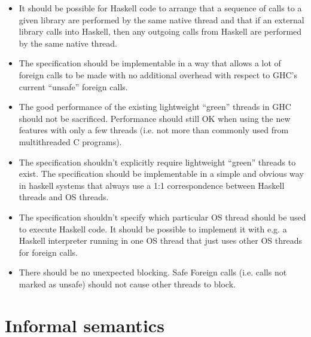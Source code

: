 \documentclass{article}
\begin{document}
\begin{itemize}
\item It should be possible for Haskell code to arrange that a sequence of
calls to a given library are performed by the same native thread and
that if an external library calls into Haskell, then any outgoing calls
from Haskell are performed by the same native thread.

\item The specification should be implementable in a way that allows a lot
of foreign calls to be made with no additional overhead with respect to
GHC's current ``unsafe'' foreign calls.

\item The good performance of the existing lightweight ``green'' threads in
GHC should not be sacrificed. Performance should still OK when using
the new features with only a few threads (i.e. not more than commonly
used from multithreaded C programs).

\item The specification shouldn't explicitly require lightweight ``green''
threads to exist. The specification should be implementable in a simple
and obvious way in haskell systems that always use a 1:1 correspondence
between Haskell threads and OS threads.

\item The specification shouldn't specify which particular OS thread
should be used to execute Haskell code. It should be possible to
implement it with e.g. a Haskell interpreter running in one OS thread
that just uses other OS threads for foreign calls.

\item There should be no unexpected blocking. Safe Foreign calls (i.e. calls not
marked as unsafe) should not cause other threads to block.
\end{itemize}

\newpage
\section{Informal semantics}
\end{document}
